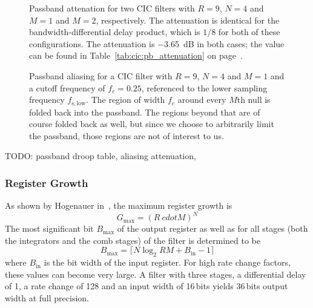\begin{figure}
    \centering
        
        \caption[CIC Filter: Passband and Aliasing Attenuation]{%
            Passband  attenation for  two CIC  filters with  $R=9$, $N=4$  and
            $M=1$ and  $M=2$, respectively. The  attenuation is  identical for
            the bandwidth-differential delay product,  which is $1/8$ for both
            of these configurations.\protect\newline
            The   attenuation   is   \SI{-3.65}{\dB}  in   both   cases;   the
            value  can  be   found  in  Table~\ref{tab:cic:pb_attenuation}  on
            page~\pageref{tab:cic:pb_attenuation}.%
        }
        \label{fig:cic:freq_responses:passband:attenuation}
\end{figure}

\begin{figure}
    \centering
        
        \caption[CIC Filter: Passband and Aliasing Attenuation]{%
            Passband aliasing for  a CIC filter with $R =  9$, $N=4$ and $M=1$
            and a  cutoff frequency of $f_c  = 0.25$, referenced to  the lower
            sampling frequency $f_\mathrm{s,low}$.\protect\newline
            The region of  width $f_c$ around every $M$th null  is folded back
            into the  passband. The regions beyond  that are of  course folded
            back  as  well, but  since  we  choose  to arbitrarily  limit  the
            passband, those regions are not of interest to us.%
        }
        \label{fig:cic:freq_responses:passband:aliasing}
\end{figure}

TODO: passband droop table, aliasing attenuation, 

\subsubsection{Register Growth}
\label{subsubsec:cic:register_growth}

As shown by Hogenauer in~\cite{1163535}, the maximum register growth is
\begin{equation}
    \label{eq:cic:maximum_register_growth}
    G_\mathrm{max} = (R\ cdot M)^N
\end{equation}
The most  significant bit $B_\mathrm{max}$ of  the output register as  well as
for all  stages (both the  integrators and the comb  stages) of the  filter is
determined to be
\begin{equation}
    \label{eq:cic:maximum_register_growth:bit_width}
    B_\mathrm{max} = \lceil N \log_2 RM + B_\mathrm{in} - 1 \rceil
\end{equation}
where $B_\mathrm{in}$ is  the bit width of the input  register.  For high rate
change  factors, these  values can  become very  large.  A  filter with  three
stages, a  differential delay of  \num{1}, a rate  change of \num{128}  and an
input  width of  \num{16}\,bits  yields  \num{36}\,bits output  width at  full
precision.

